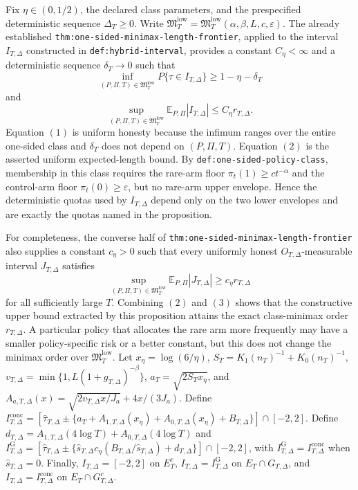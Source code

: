 Fix \(\eta\in(0,1/2)\), the declared class parameters, and the prespecified deterministic sequence \(\Delta_T\geq0\).  Write \(\mathfrak M_T^{\mathrm{low}}=\mathfrak M_T^{\mathrm{low}}(\alpha,\beta,L,c,\varepsilon)\).  The already established \texttt{thm:one-sided-minimax-length-frontier}, applied to the interval \(I_{T,\Delta}\) constructed in \texttt{def:hybrid-interval}, provides a constant \(C_\eta<\infty\) and a deterministic sequence \(\delta_T\to0\) such that
\[
 \inf_{(P,\Pi,T)\in\mathfrak M_T^{\mathrm{low}}}
 P\{\tau\in I_{T,\Delta}\}
 \geq 1-\eta-\delta_T                                                        \tag{1}
\]
and
\[
 \sup_{(P,\Pi,T)\in\mathfrak M_T^{\mathrm{low}}}
 \mathbb E_{P,\Pi}|I_{T,\Delta}|
 \leq C_\eta r_{T,\Delta}.                                                   \tag{2}
\]
Equation \((1)\) is uniform honesty because the infimum ranges over the entire one-sided class and \(\delta_T\) does not depend on \((P,\Pi,T)\).  Equation \((2)\) is the asserted uniform expected-length bound.  By \texttt{def:one-sided-policy-class}, membership in this class requires the rare-arm floor \(\pi_t(1)\geq ct^{-\alpha}\) and the control-arm floor \(\pi_t(0)\geq\varepsilon\), but no rare-arm upper envelope.  Hence the deterministic quotas used by \(I_{T,\Delta}\) depend only on the two lower envelopes and are exactly the quotas named in the proposition.

For completeness, the converse half of \texttt{thm:one-sided-minimax-length-frontier} also supplies a constant \(c_\eta>0\) such that every uniformly honest \(O_{T,\Delta}\)-measurable interval \(J_{T,\Delta}\) satisfies
\[
 \sup_{(P,\Pi,T)\in\mathfrak M_T^{\mathrm{low}}}
 \mathbb E_{P,\Pi}|J_{T,\Delta}|
 \geq c_\eta r_{T,\Delta}                                                    \tag{3}
\]
for all sufficiently large \(T\).  Combining \((2)\) and \((3)\) shows that the constructive upper bound extracted by this proposition attains the exact class-minimax order \(r_{T,\Delta}\).  A particular policy that allocates the rare arm more frequently may have a smaller policy-specific risk or a better constant, but this does not change the minimax order over \(\mathfrak M_T^{\mathrm{low}}\).
Let \(x_\eta=\log(6/\eta)\), \(S_T=K_1(n_T)^{-1}+K_0(n_T)^{-1}\), \(v_{T,\Delta}=\min\{1,L(1+g_{T,\Delta})^{-\beta}\}\), \(a_T=\sqrt{2S_Tx_\eta}\), and \(A_{a,T,\Delta}(x)=\sqrt{2v_{T,\Delta}x/J_a}+4x/(3J_a)\). Define \(I_{T,\Delta}^{\mathrm{conc}}=[\widehat\tau_{T,\Delta}\pm\{a_T+A_{1,T,\Delta}(x_\eta)+A_{0,T,\Delta}(x_\eta)+B_{T,\Delta}\}]\cap[-2,2]\). Define \(d_{T,\Delta}=A_{1,T,\Delta}(4\log T)+A_{0,T,\Delta}(4\log T)\) and \(I_{T,\Delta}^{\mathrm G}=[\widehat\tau_{T,\Delta}\pm\{\widehat s_{T,\Delta}c_\eta(B_{T,\Delta}/\widehat s_{T,\Delta})+d_{T,\Delta}\}]\cap[-2,2]\), with \(I_{T,\Delta}^{\mathrm G}=I_{T,\Delta}^{\mathrm{conc}}\) when \(\widehat s_{T,\Delta}=0\). Finally, \(I_{T,\Delta}=[-2,2]\) on \(E_T^c\), \(I_{T,\Delta}=I_{T,\Delta}^{\mathrm G}\) on \(E_T\cap G_{T,\Delta}\), and \(I_{T,\Delta}=I_{T,\Delta}^{\mathrm{conc}}\) on \(E_T\cap G_{T,\Delta}^c\).
